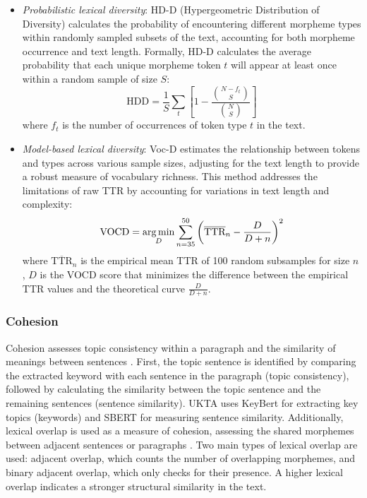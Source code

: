 \begin{itemize}[leftmargin=1.1em]
\item \textsf{\textit{Probabilistic lexical diversity}}: HD-D (Hypergeometric Distribution of Diversity) calculates the probability of encountering different morpheme types within randomly sampled subsets of the text, accounting for both morpheme occurrence and text length. 
Formally, HD-D calculates the average probability that each unique morpheme token \(t\) will appear at least once within a random sample of size \(S\):
\begin{equation}
    \text{HDD} = \frac{1}{S} \sum_{t} \left[ 1 - \frac{\binom{N - f_t}{S}}{\binom{N}{S}} \right]
\end{equation}
where \(f_t\) is the number of occurrences of token type \(t\) in the text. 

\item \textsf{\textit{Model-based lexical diversity}}:  
Voc-D estimates the relationship between tokens and types across various sample sizes, adjusting for the text length to provide a robust measure of vocabulary richness. This method addresses the limitations of raw TTR by accounting for variations in text length and complexity:
\begin{equation}
    \text{VOCD} = \operatorname*{arg\,min}_{D} \sum_{n=35}^{50} \left( \overline{\text{TTR}}_n - \frac{D}{D+n} \right)^2
\end{equation}
where $\overline{\text{TTR}}_n$ is the empirical mean TTR of 100 random subsamples for size $n$, $D$ is the VOCD score that minimizes the difference between the empirical TTR values and the theoretical curve \(\frac{D}{D+n}\).
\end{itemize} 




\subsubsection*{Cohesion}

Cohesion assesses topic consistency within a paragraph and the similarity of meanings between sentences \cite{kim2024korcat}.  
First, the topic sentence is identified by comparing the extracted keyword with each sentence in the paragraph (topic consistency), followed by calculating the similarity between the topic sentence and the remaining sentences (sentence similarity). 
\textsf{UKTA} uses KeyBert \cite{maarten2023keybert} for extracting key topics (keywords) and SBERT \cite{nils2019sbert} for measuring sentence similarity. 
Additionally, lexical overlap is used as a measure of cohesion, assessing the shared morphemes between adjacent sentences or paragraphs \cite{crossley2019taaco, kim2024korcat}. 
Two main types of lexical overlap are used: adjacent overlap, which counts the number of overlapping morphemes, and binary adjacent overlap, which only checks for their presence.
A higher lexical overlap indicates a stronger structural similarity in the text.



